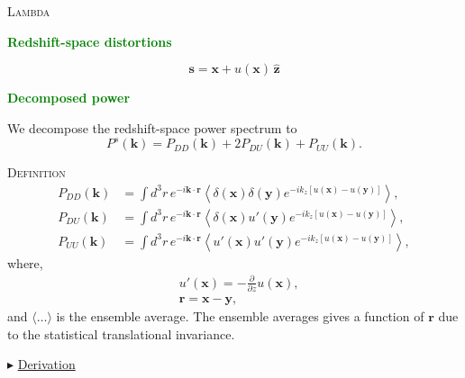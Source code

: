 \documentclass[a4paper,11pt, fleqn]{article}
\begin{document}
%
%
\vspace{0.3 \paperheight}
\begin{center}
  {\Huge \textsc{Lambda}}
\end{center}

%
%
\newpage

{\Huge \textbf{\textcolor{Green}{Redshift-space distortions}}}

\begin{equation}
  \bm{s} = \bm{x} + u(\bm{x}) \, \hat{\bm{z}}
\end{equation}

%
%
\newpage

{\Huge \textbf{\textcolor{Green}{Decomposed power}}}

\vspace{10mm}

We decompose the redshift-space power spectrum to
%
\begin{equation}
  P^s(\bm{k}) = P_{DD}(\bm{k}) + 2 P_{DU}(\bm{k}) + P_{UU}(\bm{k}).
\end{equation}

\vspace{5mm}
\textsc{Definition}
\vspace{-2mm}
%
\begin{align}
  P_{DD}(\bm{k}) &=
  \int\! d^3 r \, e^{-i \bm{k}\cdot\bm{r}}
  \left\langle
    \delta(\bm{x}) \delta(\bm{y}) e^{-ik_z [u(\bm{x}) - u(\bm{y})]}
    \right\rangle,\\
  P_{DU}(\bm{k}) &=
  \int\! d^3 r \, e^{-i \bm{k}\cdot\bm{r}}
  \left\langle
    \delta(\bm{x}) u'(\bm{y}) e^{-ik_z [u(\bm{x}) - u(\bm{y})]}
    \right\rangle,\\
  P_{UU}(\bm{k}) &=
  \int\! d^3 r \, e^{-i \bm{k}\cdot\bm{r}}
  \left\langle
    u'(\bm{x}) u'(\bm{y}) e^{-ik_z [u(\bm{x}) - u(\bm{y})]}
    \right\rangle,
\end{align}
%
where,
\begin{align}
  &u'(\bm{x}) = - \frac{\partial}{\partial z} u(\bm{x}),\\
  &\bm{r}     = \bm{x} - \bm{y},
\end{align}
%
and $\langle\dots\rangle$ is the ensemble average. The ensemble
averages gives a function of $\bm{r}$ due to the statistical
translational invariance.

\vspace{10mm}
$\blacktriangleright$ \hyperlink{link:decomposed-power-derivation}{Derivation}
\end{document}
